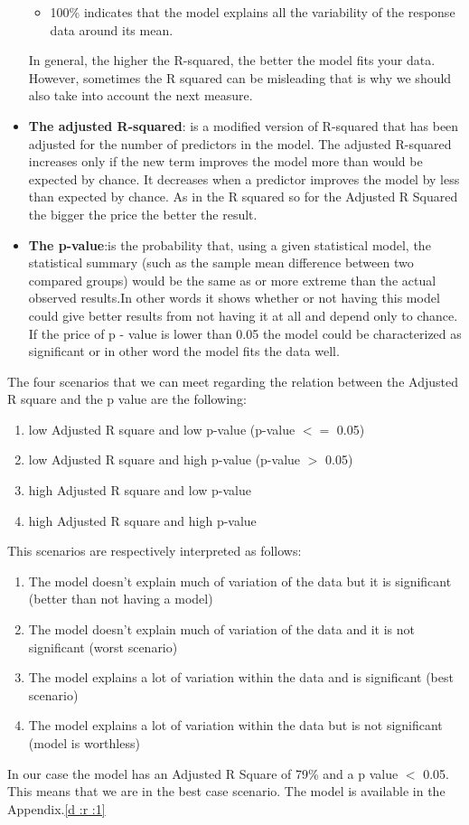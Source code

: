 \documentclass{book}
\begin{document}
\begin{itemize}
\begin{itemize}
\item 100\% indicates that the model explains all the variability of the response data around its mean.
\end{itemize}
In general, the higher the R-squared, the better the model fits your data. However, sometimes the R squared can be misleading that is why we should also take into account the next measure.
\item \textbf{The adjusted R-squared}: is a modified version of R-squared that has been adjusted for the number of predictors in the model. The adjusted R-squared increases only if the new term improves the model more than would be expected by chance. It decreases when a predictor improves the model by less than expected by chance. As in the R squared so for the Adjusted R Squared the bigger the price the better the result.
\item \textbf{The p-value}:is the probability that, using a given statistical model, the statistical summary (such as the sample mean difference between two compared groups) would be the same as or more extreme than the actual observed results.In other words it shows whether or not having this model could give better results from not having it at all and depend only to chance. If the price of p - value is lower than 0.05 the model could be characterized as significant or in other word the model fits the data well.
\end{itemize}  
The four scenarios that we can meet regarding the relation between the Adjusted R square and the p value are the following:
\begin{enumerate}
\item low Adjusted R square and low p-value (p-value $<=$ 0.05)
\item low Adjusted R square and high p-value (p-value $>$ 0.05)
\item high Adjusted R square and low p-value
\item high Adjusted R square and high p-value
\end{enumerate}
This scenarios are respectively interpreted as follows:
\begin{enumerate}
\item The model doesn't explain much of variation of the data but it is significant (better than not having a model)
\item The model doesn't explain much of variation of the data and it is not significant (worst scenario)
\item The model explains a lot of variation within the data and is significant (best scenario)
\item The model explains a lot of variation within the data but is not significant (model is worthless)
\end{enumerate}
In our case the model has an Adjusted R Square of 79\% and a p value $<$ 0.05. This means that we are in the best case scenario. The model is available in the Appendix.\ref{d :r :1}
\end{document}
